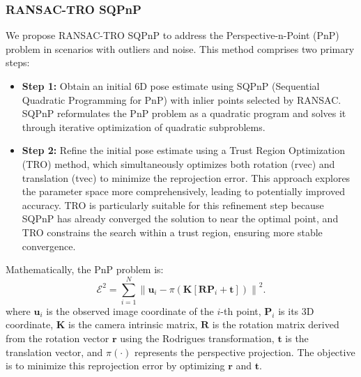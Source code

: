 \documentclass[a4paper,fleqn]{cas-sc}
\begin{document}
\subsubsection{RANSAC-TRO SQPnP}
We propose RANSAC-TRO SQPnP to address the Perspective-n-Point (PnP) problem in scenarios with outliers and noise. This method comprises two primary steps:

\begin{itemize}
	\item \textbf{Step 1:} Obtain an initial 6D pose estimate using SQPnP (Sequential Quadratic Programming for PnP)\citep{terzakis2020consistently} with inlier points selected by RANSAC. SQPnP reformulates the PnP problem as a quadratic program and solves it through iterative optimization of quadratic subproblems.
	\item \textbf{Step 2:} Refine the initial pose estimate using a Trust Region Optimization (TRO) method, which simultaneously optimizes both rotation (rvec) and translation (tvec) to minimize the reprojection error. This approach explores the parameter space more comprehensively, leading to potentially improved accuracy. TRO is particularly suitable for this refinement step because SQPnP has already converged the solution to near the optimal point, and TRO constrains the search within a trust region, ensuring more stable convergence.
\end{itemize}

Mathematically, the PnP problem is:
\begin{equation}
	\mathcal{E}^2 = \sum_{i=1}^{N} \left\lVert \mathbf{u}_i - \pi\left(\mathbf{K} \left[ \mathbf{R} \mathbf{P}_i + \mathbf{t} \right] \right) \right\rVert^2.
\end{equation}
where $\mathbf{u}_i$ is the observed image coordinate of the $i$-th point, $\mathbf{P}_i$ is its 3D coordinate, $\mathbf{K}$ is the camera intrinsic matrix, $\mathbf{R}$ is the rotation matrix derived from the rotation vector $\mathbf{r}$ using the Rodrigues transformation, $\mathbf{t}$ is the translation vector, and $\pi(\cdot)$ represents the perspective projection. The objective is to minimize this reprojection error by optimizing $\mathbf{r}$ and $\mathbf{t}$. 
\end{document}
